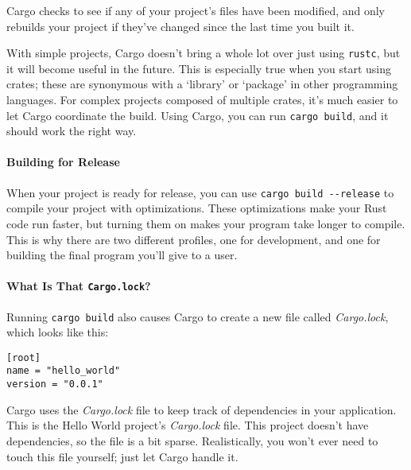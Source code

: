 \documentclass[a4paper,]{book}
\newenvironment{Shaded}{\begin{snugshade}}{\end{snugshade}}
\newcommand{\KeywordTok}[1]{\textcolor[rgb]{0.13,0.29,0.53}{\textbf{{#1}}}}
\newcommand{\NormalTok}[1]{{#1}}
\let\oldparagraph\paragraph
\renewcommand{\paragraph}[1]{\oldparagraph{#1}\mbox{}}
\begin{document}
\begin{Shaded}
\end{Shaded}

Cargo checks to see if any of your project's files have been modified,
and only rebuilds your project if they've changed since the last time
you built it.

With simple projects, Cargo doesn't bring a whole lot over just using
\texttt{rustc}, but it will become useful in the future. This is
especially true when you start using crates; these are synonymous with a
`library' or `package' in other programming languages. For complex
projects composed of multiple crates, it's much easier to let Cargo
coordinate the build. Using Cargo, you can run \texttt{cargo\ build},
and it should work the right way.

\paragraph{Building for Release}\label{building-for-release}

When your project is ready for release, you can use
\texttt{cargo\ build\ -\/-release} to compile your project with
optimizations. These optimizations make your Rust code run faster, but
turning them on makes your program take longer to compile. This is why
there are two different profiles, one for development, and one for
building the final program you'll give to a user.

\paragraph{\texorpdfstring{What Is That
\texttt{Cargo.lock}?}{What Is That Cargo.lock?}}\label{what-is-that-cargo.lock}

Running \texttt{cargo\ build} also causes Cargo to create a new file
called \emph{Cargo.lock}, which looks like this:

\begin{verbatim}
[root]
name = "hello_world"
version = "0.0.1"
\end{verbatim}

Cargo uses the \emph{Cargo.lock} file to keep track of dependencies in
your application. This is the Hello World project's \emph{Cargo.lock}
file. This project doesn't have dependencies, so the file is a bit
sparse. Realistically, you won't ever need to touch this file yourself;
just let Cargo handle it.
\end{document}

